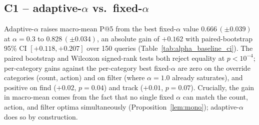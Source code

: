 ﻿\documentclass[conference]{IEEEtran}
\theoremstyle{definition}
\begin{document}
\subsection{C1 -- adaptive-\texorpdfstring{$\alpha$}{alpha} vs.\ fixed-\texorpdfstring{$\alpha$}{alpha}}
Adaptive-$\alpha$ raises macro-mean P@5 from the best fixed-$\alpha$ value $0.666\,(\pm0.039)$ at $\alpha{=}0.3$ to $0.828\,(\pm0.034)$, an absolute gain of $+0.162$ with paired-bootstrap 95\% CI $[+0.118,+0.207]$ over 150 queries (Table~\ref{tab:alpha_baseline_ci}). The paired bootstrap and Wilcoxon signed-rank tests both reject equality at $p<10^{-4}$; per-category gains against the per-category best fixed-$\alpha$ are zero on the override categories (count, action) and on filter (where $\alpha{=}1.0$ already saturates), and positive on find ($+0.02$, $p=0.04$) and track ($+0.01$, $p=0.07$). Crucially, the gain in macro-mean comes from the fact that no single fixed $\alpha$ can match the count, action, and filter optima simultaneously (Proposition~\ref{lem:mono}); adaptive-$\alpha$ does so by construction.

\begin{table}[!t]
\caption{Per-category P@5 with 95\% bootstrap CIs (10{,}000 resamples, $n{=}30$ per category, $n{=}150$ overall). $\Delta$ is the per-query mean of (adaptive $-$ per-category best-fixed-$\alpha$); $p$ is two-sided paired bootstrap. The bottom row compares the best single fixed-$\alpha$ macro-mean ($\alpha{=}0.3$) against adaptive-$\alpha$.}
\label{tab:alpha_baseline_ci}
\centering
\scriptsize
\setlength{\tabcolsep}{3pt}
\end{table}
\end{document}
